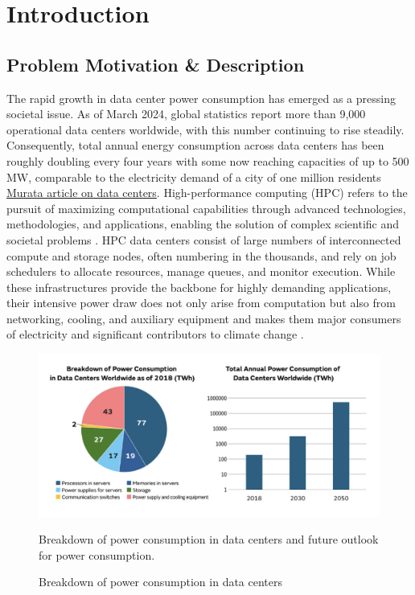 \section{Introduction}
\label{cha:introduction}

\subsection{Problem Motivation \& Description}
\label{subse:problem_motivation_description}
The rapid growth in data center power consumption has emerged as a pressing societal issue. As of March 2024, global statistics report more than 9,000 operational data centers worldwide, with this number continuing to rise steadily. Consequently, total annual energy consumption across data centers has been roughly doubling every four years with some now reaching capacities of up to 500 MW, comparable to the electricity demand of a city of one million residents \href{https://article.murata.com/en-eu/article/data-center-4}{Murata article on data centers}.
High-performance computing (HPC) refers to the pursuit of maximizing computational capabilities through advanced technologies, methodologies, and applications, enabling the solution of complex scientific and societal problems \cite{STERLING201843}. HPC data centers consist of large numbers of interconnected compute and storage nodes, often numbering in the thousands, and rely on job schedulers to allocate resources, manage queues, and monitor execution. While these infrastructures provide the backbone for highly demanding applications, their intensive power draw does not only arise from computation but also from networking, cooling, and auxiliary equipment and makes them major consumers of electricity and significant contributors to climate change \cite{Silva_2024}.

\begin{figure}[H]
    \centering
    \includegraphics[scale=0.5]{fig/01/01-motivation.pdf}
    \small
    \caption{Breakdown of power consumption in data centers}
    \label{fig:01-motivation}
    \tiny
    Breakdown of power consumption in data centers and future outlook for power consumption.
\end{figure}

